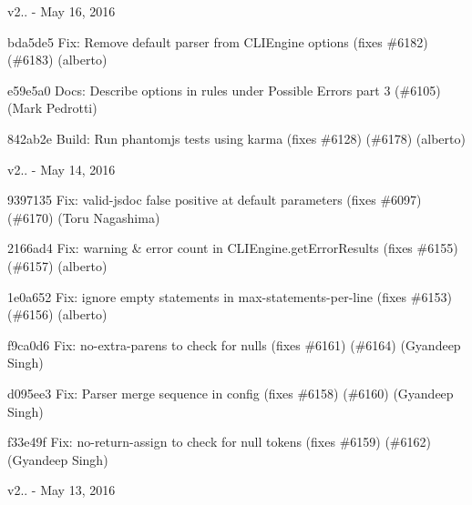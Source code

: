 v2.. -\/ May 16, 2016


\begin{DoxyItemize}
\item bda5de5 Fix\+: Remove default parser from C\+L\+I\+Engine options (fixes \#6182) (\#6183) (alberto)
\item e59e5a0 Docs\+: Describe options in rules under Possible Errors part 3 (\#6105) (Mark Pedrotti)
\item 842ab2e Build\+: Run phantomjs tests using karma (fixes \#6128) (\#6178) (alberto)
\end{DoxyItemize}

v2.. -\/ May 14, 2016


\begin{DoxyItemize}
\item 9397135 Fix\+: {\ttfamily valid-\/jsdoc} false positive at default parameters (fixes \#6097) (\#6170) (Toru Nagashima)
\item 2166ad4 Fix\+: warning \& error count in {\ttfamily C\+L\+I\+Engine.\+get\+Error\+Results} (fixes \#6155) (\#6157) (alberto)
\item 1e0a652 Fix\+: ignore empty statements in max-\/statements-\/per-\/line (fixes \#6153) (\#6156) (alberto)
\item f9ca0d6 Fix\+: {\ttfamily no-\/extra-\/parens} to check for nulls (fixes \#6161) (\#6164) (Gyandeep Singh)
\item d095ee3 Fix\+: Parser merge sequence in config (fixes \#6158) (\#6160) (Gyandeep Singh)
\item f33e49f Fix\+: {\ttfamily no-\/return-\/assign} to check for null tokens (fixes \#6159) (\#6162) (Gyandeep Singh)
\end{DoxyItemize}

v2.. -\/ May 13, 2016


